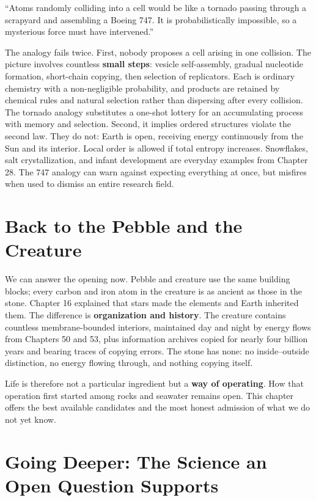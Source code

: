 \begin{wuqu}
``Atoms randomly colliding into a cell would be like a tornado passing through a scrapyard and assembling a Boeing 747. It is probabilistically impossible, so a mysterious force must have intervened.''

The analogy fails twice. First, nobody proposes a cell arising in one collision. The picture involves countless \textbf{small steps}: vesicle self-assembly, gradual nucleotide formation, short-chain copying, then selection of replicators. Each is ordinary chemistry with a non-negligible probability, and products are retained by chemical rules and natural selection rather than dispersing after every collision. The tornado analogy substitutes a one-shot lottery for an accumulating process with memory and selection. Second, it implies ordered structures violate the second law. They do not: Earth is open, receiving energy continuously from the Sun and its interior. Local order is allowed if total entropy increases. Snowflakes, salt crystallization, and infant development are everyday examples from Chapter 28. The 747 analogy can warn against expecting everything at once, but misfires when used to dismiss an entire research field.
\end{wuqu}

\section{Back to the Pebble and the Creature}

We can answer the opening now. Pebble and creature use the same building blocks; every carbon and iron atom in the creature is as ancient as those in the stone. Chapter 16 explained that stars made the elements and Earth inherited them. The difference is \textbf{organization and history}. The creature contains countless membrane-bounded interiors, maintained day and night by energy flows from Chapters 50 and 53, plus information archives copied for nearly four billion years and bearing traces of copying errors. The stone has none: no inside--outside distinction, no energy flowing through, and nothing copying itself.

Life is therefore not a particular ingredient but a \textbf{way of operating}. How that operation first started among rocks and seawater remains open. This chapter offers the best available candidates and the most honest admission of what we do not yet know.

\section{Going Deeper: The Science an Open Question Supports}

